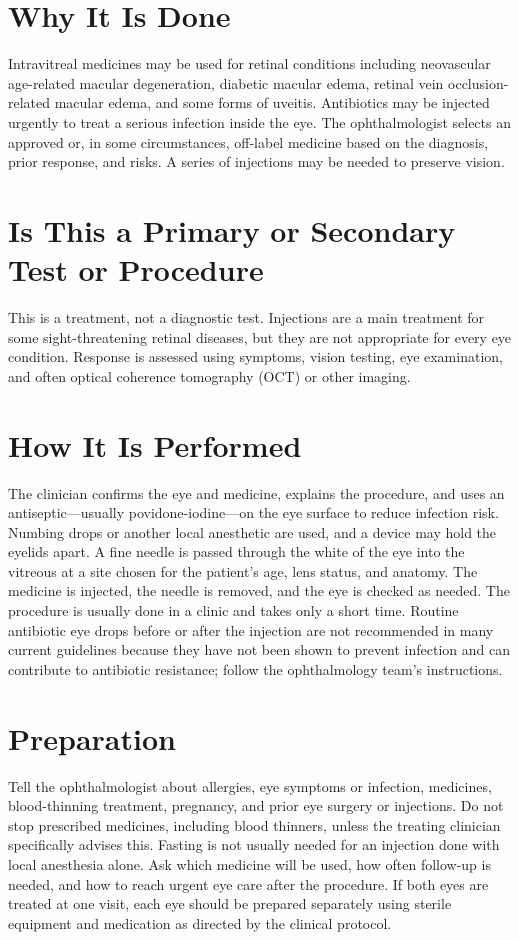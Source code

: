 \section*{Why It Is Done}
Intravitreal medicines may be used for retinal conditions including neovascular age-related macular degeneration, diabetic macular edema, retinal vein occlusion-related macular edema, and some forms of uveitis. Antibiotics may be injected urgently to treat a serious infection inside the eye. The ophthalmologist selects an approved or, in some circumstances, off-label medicine based on the diagnosis, prior response, and risks. A series of injections may be needed to preserve vision.

\section*{Is This a Primary or Secondary Test or Procedure}
This is a treatment, not a diagnostic test. Injections are a main treatment for some sight-threatening retinal diseases, but they are not appropriate for every eye condition. Response is assessed using symptoms, vision testing, eye examination, and often optical coherence tomography (OCT) or other imaging.

\section*{How It Is Performed}
The clinician confirms the eye and medicine, explains the procedure, and uses an antiseptic—usually povidone-iodine—on the eye surface to reduce infection risk. Numbing drops or another local anesthetic are used, and a device may hold the eyelids apart. A fine needle is passed through the white of the eye into the vitreous at a site chosen for the patient's age, lens status, and anatomy. The medicine is injected, the needle is removed, and the eye is checked as needed. The procedure is usually done in a clinic and takes only a short time. Routine antibiotic eye drops before or after the injection are not recommended in many current guidelines because they have not been shown to prevent infection and can contribute to antibiotic resistance; follow the ophthalmology team's instructions.

\section*{Preparation}
Tell the ophthalmologist about allergies, eye symptoms or infection, medicines, blood-thinning treatment, pregnancy, and prior eye surgery or injections. Do not stop prescribed medicines, including blood thinners, unless the treating clinician specifically advises this. Fasting is not usually needed for an injection done with local anesthesia alone. Ask which medicine will be used, how often follow-up is needed, and how to reach urgent eye care after the procedure. If both eyes are treated at one visit, each eye should be prepared separately using sterile equipment and medication as directed by the clinical protocol.

